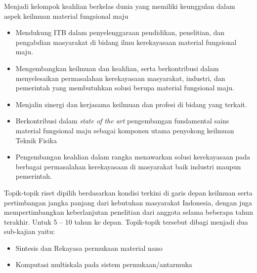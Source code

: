 \documentclass[a0,landscape]{a0poster}
\begin{document}
\begin{multicols}{3}
{\LARGE
\begin{tcolorbox}[
  colback=blue!5,
  colframe=blue!40!black,
  title=Visi]
\vspace{1cm}
Menjadi kelompok keahlian berkelas dunia yang memiliki keunggulan
dalam aspek keilmuan material fungsional maju
\end{tcolorbox}
}
%
{\LARGE
\begin{tcolorbox}[
  colback=blue!5,
  colframe=blue!40!black,
  title=Misi]
\vspace{1cm}
\begin{itemize}
\item Mendukung ITB dalam penyelenggaraan pendidikan, penelitian, dan pengabdian 
 masyarakat di bidang ilmu kerekayasaan material fungsional maju.
\item Mengembangkan keilmuan dan keahlian, serta berkontribusi dalam menyelesaikan
 permasalahan kerekayasaan masyarakat, industri, dan pemerintah yang membutuhkan solusi berupa material fungsional maju.
\item Menjalin sinergi dan kerjasama keilmuan dan profesi di bidang yang terkait.
\end{itemize}
\end{tcolorbox}
}
%
{\LARGE
\begin{tcolorbox}[
  colback=blue!5,
  colframe=blue!40!black,
  title=Tujuan]
\vspace{1cm}
\begin{itemize}
\item Berkontribusi dalam \textit{state of the art} pengembangan fundamental sains material fungsional maju sebagai komponen utama penyokong keilmuan Teknik Fisika
\item Pengembangan keahlian dalam rangka menawarkan solusi kerekayasaan pada berbagai permasalahan kerekayasaan di masyarakat baik industri maupun pemerintah.
\end{itemize}
\end{tcolorbox}
} 
%
{\LARGE
\begin{tcolorbox}[
  colback=blue!5,
  colframe=blue!40!black,
  title=Peta Jalan Penelitian]
\vspace{1cm}
Topik-topik riset dipilih berdasarkan kondisi terkini di
garis depan keilmuan serta pertimbangan jangka panjang dari kebutuhan masyarakat 
Indonesia, dengan juga mempertimbangkan keberlanjutan penelitian dari anggota selama 
beberapa tahun terakhir. Untuk 5 – 10 tahun ke depan. Topik-topik tersebut dibagi menjadi 
dua sub-kajian yaitu:
\begin{itemize}
\item Sintesis dan Rekayasa permukaan material nano
\item Komputasi multiskala pada sistem permukaan/antarmuka
\end{itemize}
\end{tcolorbox}
} 


\end{multicols}
\end{document}
